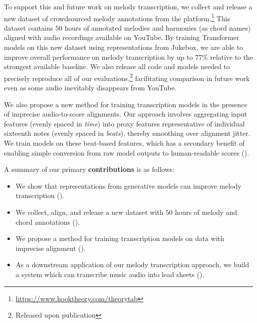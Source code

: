 To support this and future work on melody transcription, we collect and release a new dataset of crowdsourced melody annotations from the \hooktheory{} platform.\footnote{\url{https://www.hooktheory.com/theorytab}} 
This dataset contains $50$ hours of annotated melodies and harmonies (as chord names) aligned with audio recordings available on YouTube. 
By training Transformer models on this new dataset using representations from Jukebox, we are able to improve overall performance on melody transcription by 
up to $77$\% 
relative to the strongest available baseline. 
We also release all code and models needed to precisely reproduce all of our evaluations,\footnote{Released upon publication} facilitating comparison in future work even as some audio inevitably disappears from YouTube.

We also propose a new method for training transcription models in the presence of imprecise audio-to-score alignments. 
Our approach 
involves aggregating input features (evenly spaced in \emph{time}) into proxy features representative of individual sixteenth notes (evenly spaced in \emph{beats}), 
thereby smoothing over alignment jitter. 
We train models on these beat-based features, 
which has a secondary benefit of enabling simple conversion from raw model outputs to human-readable scores ().

A summary of our primary \textbf{contributions} is as follows:
\begin{itemize}
    \item We show that representations from generative models can improve melody transcription ().
    \item We collect, align, and release a new dataset with $50$ hours of melody and chord annotations ().
    \item We propose a method for training transcription models on data with imprecise alignment ().
    \item As a downstream application of our melody transcription approach, we build a system which can transcribe music audio into lead sheets ().
\end{itemize}